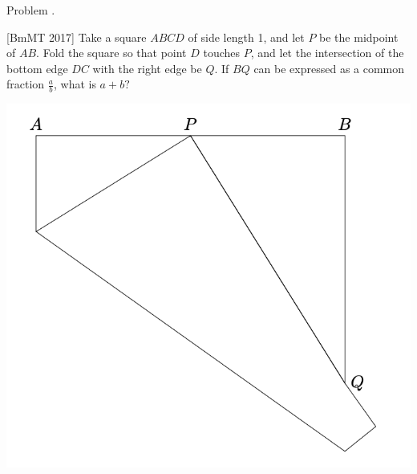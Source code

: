 \documentclass[9pt]{beamer}
\newcounter{problem}[section]
\begin{document}
\begin{frame}[t, fragile]{Problem \thesection.\theproblem}
    \begin{block}{}[BmMT 2017]
Take a square $ ABCD $ of side length 1, and let $ P $ be the midpoint of $ AB $. Fold the square so
that point $ D $ touches $ P $, and let the intersection of the bottom edge $ DC $ with the right edge be $ Q $. If $ BQ $ can be expressed as a common fraction $ \frac{a}{b} $, what is $ a + b? $
    \end{block}
    \begin{center}
        \includegraphics[scale=0.5]{bmmt_17_16}
    \end{center}
    
    \end{frame}
\end{document}
